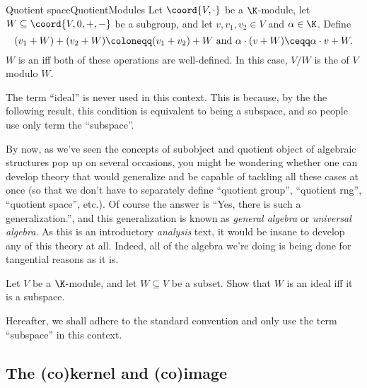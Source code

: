 \begin{dfn}{Quotient space}{QuotientModules}
	Let $\coord{V,\cdot}$ be a $\K$-module, let $W\subseteq \coord{V,0,+,-}$ be a subgroup, and let $v,v_1,v_2\in V$ and $\alpha \in \K$.  Define
	\begin{equation}
	(v_1+W)+(v_2+W)\coloneqq (v_1+v_2)+W\text{ and }\alpha \cdot (v+W)\ceqq \alpha \cdot v+W.
	\end{equation}
	$W$ is an  iff both of these operations are well-defined.  In this case, $V/W$ is the  of $V$ modulo $W$.
	\begin{rmk}
		The term ``ideal'' is never used in this context.  This is because, by the the following result, this condition is equivalent to being a subspace, and so people use only term the ``subspace''.
	\end{rmk}
	\begin{rmk}
		By now, as we've seen the concepts of subobject and quotient object of algebraic structures pop up on several occasions, you might be wondering whether one can develop theory that would generalize and be capable of tackling all these cases at once (so that we don't have to separately define ``quotient group'', ``quotient rng'', ``quotient space'', etc.).  Of course the answer is ``Yes, there is such a generalization.'', and this generalization is known as \emph{general algebra} or \emph{universal algebra}.  As this is an introductory \emph{analysis} text, it would be insane to develop any of this theory at all.  Indeed, all of the algebra we're doing is being done for tangential reasons as it is.
	\end{rmk}
\end{dfn}
\begin{exr}{}{}
	Let $V$ be a $\K$-module, and let $W\subseteq V$ be a subset.  Show that $W$ is an ideal iff it is a subspace.
	\begin{rmk}
		Hereafter, we shall adhere to the standard convention and only use the term ``subspace'' in this context.
	\end{rmk}
\end{exr}

\subsection{The (co)kernel and (co)image}

